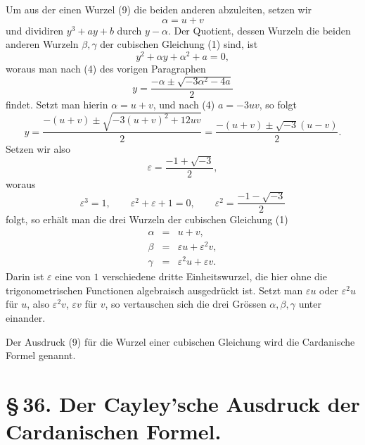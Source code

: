 \documentclass[11pt]{article}
\begin{document}
Um aus der einen Wurzel (9) die beiden anderen abzuleiten, setzen wir
\[
 \alpha=u+v
\]
und dividiren $y^3+ay+b$ durch $y-\alpha$. Der Quotient, dessen Wurzeln die beiden anderen Wurzeln $\beta,\gamma$ der cubischen Gleichung (1) sind, ist
\[
 y^2+\alpha y+\alpha^2+a=0,
\]
woraus man nach (4) des vorigen Paragraphen
\[
 y=\frac{-\alpha\pm\sqrt{-3\alpha^2-4a}}{2}
\]
findet. Setzt man hierin $\alpha=u+v$, und nach (4) $a=-3uv$, so folgt
\[
 y=\frac{-(u+v)\pm\sqrt{-3(u+v)^2+12uv}}{2}
  =\frac{-(u+v)\pm\sqrt{-3}(u-v)}{2}.
\]
Setzen wir also
\begin{equation}
\varepsilon=\frac{-1+\sqrt{-3}}{2},
\tag{11}
\end{equation}
woraus
\begin{equation}
\varepsilon^3=1,
\qquad \varepsilon^2+\varepsilon+1=0,
\qquad
\varepsilon^2=\frac{-1-\sqrt{-3}}{2}
\tag{12}
\end{equation}
folgt, so erhält man die drei Wurzeln der cubischen Gleichung (1)
\begin{equation}
\begin{array}{rcl}
\alpha&=&u+v,\\
\beta&=&\varepsilon u+\varepsilon^2v,\\
\gamma&=&\varepsilon^2u+\varepsilon v.
\end{array}
\tag{13}
\end{equation}
Darin ist $\varepsilon$ eine von $1$ verschiedene dritte Einheitswurzel, die hier ohne die trigonometrischen Functionen algebraisch ausgedrückt ist. Setzt man $\varepsilon u$ oder $\varepsilon^2u$ für $u$, also $\varepsilon^2v$, $\varepsilon v$ für $v$, so vertauschen sich die drei Grössen $\alpha,\beta,\gamma$ unter einander.

Der Ausdruck (9) für die Wurzel einer cubischen Gleichung wird die Cardanische Formel genannt.

\section*{\S\,36. Der Cayley'sche Ausdruck der Cardanischen Formel.}
\end{document}
